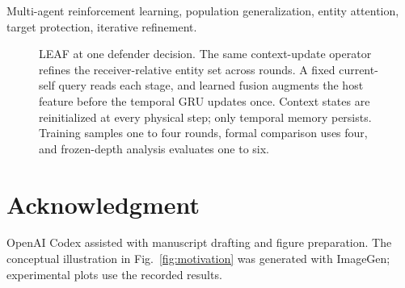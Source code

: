 \documentclass[journal,10pt]{IEEEtran}
\begin{document}
\par
\begin{IEEEkeywords}
Multi-agent reinforcement learning, population generalization, entity attention, target protection, iterative refinement.
\end{IEEEkeywords}



\begin{figure}[!t]
\centering
\resizebox{\textwidth}{!}{}
\caption{LEAF at one defender decision. The same context-update operator refines the receiver-relative entity set across rounds. A fixed current-self query reads each stage, and learned fusion augments the host feature before the temporal GRU updates once. Context states are reinitialized at every physical step; only temporal memory persists. Training samples one to four rounds, formal comparison uses four, and frozen-depth analysis evaluates one to six.}
\label{fig:framework}
\end{figure}


\FloatBarrier

\section*{Acknowledgment}
OpenAI Codex assisted with manuscript drafting and figure preparation. The conceptual illustration in Fig.~\ref{fig:motivation} was generated with ImageGen; experimental plots use the recorded results.


\end{document}

